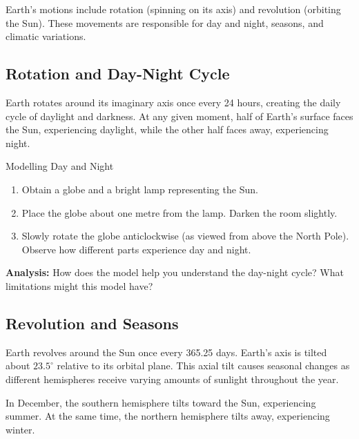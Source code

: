 Earth's motions include rotation (spinning on its axis) and revolution (orbiting the Sun). These movements are responsible for day and night, seasons, and climatic variations.

\subsection{Rotation and Day-Night Cycle}

Earth rotates around its imaginary axis once every 24 hours, creating the daily cycle of daylight and darkness. At any given moment, half of Earth's surface faces the Sun, experiencing daylight, while the other half faces away, experiencing night.


\begin{investigation}{Modelling Day and Night}
\begin{enumerate}
    \item Obtain a globe and a bright lamp representing the Sun.
    \item Place the globe about one metre from the lamp. Darken the room slightly.
    \item Slowly rotate the globe anticlockwise (as viewed from above the North Pole). Observe how different parts experience day and night.
\end{enumerate}
\textbf{Analysis:} How does the model help you understand the day-night cycle? What limitations might this model have?
\end{investigation}

\subsection{Revolution and Seasons}

Earth revolves around the Sun once every 365.25 days. Earth's axis is tilted about \(23.5^\circ\) relative to its orbital plane. This axial tilt causes seasonal changes as different hemispheres receive varying amounts of sunlight throughout the year.


\begin{example}
In December, the southern hemisphere tilts toward the Sun, experiencing summer. At the same time, the northern hemisphere tilts away, experiencing winter.
\end{example}


